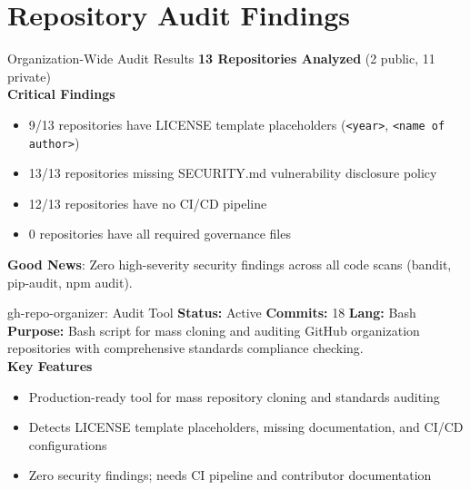 \documentclass[aspectratio=169]{beamer}
\begin{document}
\section{Repository Audit Findings}

\begin{frame}{Organization-Wide Audit Results \; \faClipboardCheck}
  \textbf{13 Repositories Analyzed} (2 public, 11 private)\\[3mm]
  
  \textbf{Critical Findings}
  \begin{itemize}
    \item \alert{9/13 repositories} have LICENSE template placeholders (\texttt{<year>}, \texttt{<name of author>})
    \item \alert{13/13 repositories} missing SECURITY.md vulnerability disclosure policy
    \item \alert{12/13 repositories} have no CI/CD pipeline
    \item \alert{0 repositories} have all required governance files
  \end{itemize}
  \vspace{2mm}
  \begin{tcolorbox}
    \faCheckCircle\; \textbf{Good News}: Zero high-severity security findings across all code scans (bandit, pip-audit, npm audit).
  \end{tcolorbox}
\end{frame}

\begin{frame}{gh-repo-organizer: Audit Tool \; \faDownload}
  \textbf{Status:} Active \hfill \textbf{Commits:} 18 \hfill \textbf{Lang:} Bash\\[2mm]
  \textbf{Purpose:} Bash script for mass cloning and auditing GitHub organization repositories with comprehensive standards compliance checking.\\[2mm]
  \textbf{Key Features}
  \begin{itemize}
    \item Production-ready tool for mass repository cloning and standards auditing
    \item Detects LICENSE template placeholders, missing documentation, and CI/CD configurations
    \item Zero security findings; needs CI pipeline and contributor documentation
  \end{itemize}
\end{frame}
\end{document}
